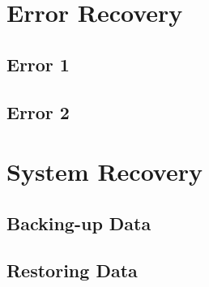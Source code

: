 \section{Error Recovery}

\subsection{Error 1}

\subsection{Error 2}

\section{System Recovery}

\subsection{Backing-up Data}

\subsection{Restoring Data}
